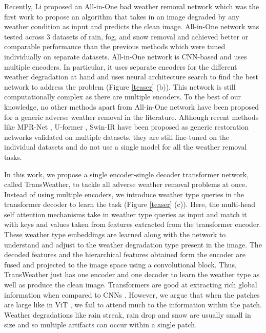 \documentclass[10pt,twocolumn,letterpaper]{article}
\begin{document}
Recently, Li \etal\cite{li2020all} proposed an All-in-One bad weather removal network which was the first work to propose an algorithm that takes in an image degraded by any weather condition as input and predicts the clean image. All-in-One network was tested across 3 datasets of rain, fog, and snow removal and achieved better or comparable performance than the previous methods which were tuned individually on separate datasets. All-in-One network is CNN-based and uses multiple encoders.  In particular, it uses separate encoders for the different weather degradation at hand and uses neural architecture search to find the best network to address the problem (Figure \ref{teaser} (b)). This network is still computationally complex as there are multiple encoders. To the best of our knowledge, no other methods apart from All-in-One network \cite{li2020all} have been proposed for a generic adverse weather removal in the literature. Although recent methods like MPR-Net \cite{zamir2021multi}, U-former \cite{wang2021uformer}, Swin-IR \cite{liang2021swinir} have been proposed as generic restoration networks validated on multiple datasets, they are still fine-tuned on the individual datasets and do not use a single model for all the weather removal tasks. 

In this work, we propose a single encoder-single decoder transformer network, called TransWeather, to tackle all adverse weather removal problems at once. Instead of using multiple encoders, we introduce weather type queries in the transformer decoder to learn the task (Figure \ref{teaser} (c)). Here, the multi-head self attention mechanisms take in weather type queries as input and match it with keys and values taken from features extracted from the transformer encoder. These weather type embeddings are learned along with the network to understand and adjust to the weather degradation type present in the image. The decoded features and the hierarchical features obtained form the encoder are fused and projected to the image space using a convolutional block. Thus, TransWeather just has one encoder and one decoder to learn the weather type as well as produce the clean image. Transformers are good at extracting rich global information when compared to CNNs \cite{dosovitskiy2020image}. However, we argue that when the patches are large like in ViT \cite{dosovitskiy2020image}, we fail to attend much to the information within the patch.  Weather degradations like rain streak, rain drop and snow are usually small in size and so multiple artifacts can occur within a single patch. 
\end{document}

